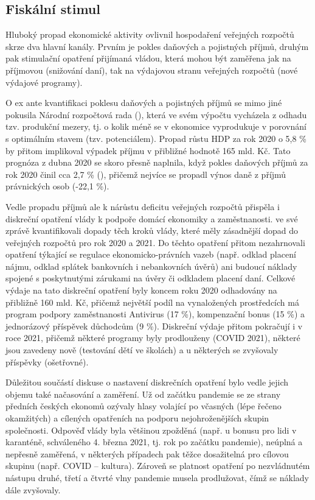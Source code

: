 \subsection*{Fiskální stimul} 
Hluboký propad ekonomické aktivity ovlivnil hospodaření veřejných rozpočtů skrze dva hlavní kanály. Prvním je pokles daňových a pojistných příjmů, druhým pak stimulační opatření přijímaná vládou, která mohou být zaměřena jak na příjmovou (snižování daní), tak na výdajovou stranu veřejných rozpočtů (nové výdajové programy). 

O ex ante kvantifikaci poklesu daňových a pojistných příjmů se mimo jiné pokusila Národní rozpočtová rada (\cite{Hlavacek2020}), která ve svém výpočtu vycházela z odhadu tzv. produkční mezery, tj. o kolik méně se v ekonomice vyprodukuje v porovnání s optimálním stavem (tzv. potenciálem). Propad růstu HDP za rok 2020 o 5,8 \% by přitom implikoval výpadek příjmu v přibližné hodnotě 165 mld. Kč. Tato prognóza z dubna 2020 se skoro přesně naplnila, když pokles daňových příjmů za rok 2020 činil cca 2,7 \% (\cite{MFCR2021}), přičemž nejvíce se propadl výnos daně z příjmů právnických osob (-22,1 \%).

Vedle propadu příjmů ale k nárůstu deficitu veřejných rozpočtů přispěla i diskreční opatření vlády k podpoře domácí ekonomiky a zaměstnanosti. \cite{Hlavacek2020} ve své zprávě kvantifikovali dopady těch kroků vlády, které měly zásadnější dopad do veřejných rozpočtů pro rok 2020 a 2021. Do těchto opatření přitom nezahrnovali opatření týkající se regulace ekonomicko-právních vazeb (např. odklad placení nájmu, odklad splátek bankovních i nebankovních úvěrů) ani budoucí náklady spojené s poskytnutými zárukami na úvěry či odkladem placení daní. Celkové výdaje na tato diskreční opatření byly koncem roku 2020 odhadovány na přibližně 160 mld. Kč, přičemž největší podíl na vynaložených prostředcích má program podpory zaměstnanosti Antivirus (17 \%), kompenzační bonus (15 \%) a jednorázový příspěvek důchodcům (9 \%). Diskreční výdaje přitom pokračují i v roce 2021, přičemž některé programy byly prodlouženy (COVID 2021), některé jsou zavedeny nově (testování dětí ve školách) a u některých se zvyšovaly příspěvky (ošetřovné).

Důležitou součástí diskuse o nastavení diskrečních opatření bylo vedle jejich objemu také načasování a zaměření. Už od začátku pandemie se ze strany předních českých ekonomů ozývaly hlasy volající po včasných (lépe řečeno okamžitých) a cílených opatřeních na podporu nejohroženějších skupin spo\-le\-čno\-sti. Odpověď vlády byla většinou zpožděná (např. u bonusu pro lidi v karanténě, schváleného 4. března 2021, tj. rok po začátku pandemie), neúplná a nepřesně zaměřená, v některých případech pak těžce dosažitelná pro cílovou skupinu (např. COVID – kultura). Zároveň se platnost opatření po nezvládnutém nástupu druhé, třetí a čtvrté vlny pandemie musela prodlužovat, čímž se náklady dále zvyšovaly.

